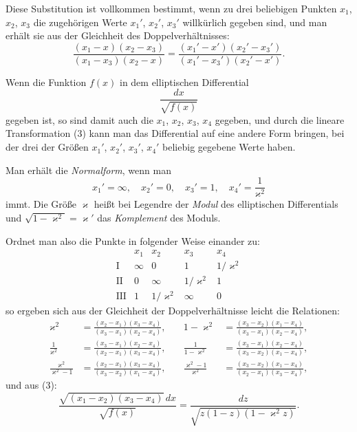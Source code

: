\documentclass[12pt,a4paper]{book}
\theoremstyle{definition}
\begin{document}
Diese Substitution ist vollkommen bestimmt, wenn zu drei
beliebigen Punkten $x_1$, $x_2$, $x_3$ die zugeh\"origen Werte $x_1'$, $x_2'$, $x_3'$
willk\"urlich gegeben sind, und man erh\"alt sie aus der Gleichheit
des Doppelverh\"altnisses:
\begin{equation}
\frac{(x_1 - x)(x_2 - x_3)}{(x_1 - x_3)(x_2 - x)} = \frac{(x_1' - x')(x_2' - x_3')}{(x_1' - x_3')(x_2' - x')}. \tag{4}
\end{equation}

Wenn die Funktion $f(x)$ in dem elliptischen Differential
\[
\frac{dx}{\sqrt{f(x)}}
\]
gegeben ist, so sind damit auch die $x_1$, $x_2$, $x_3$, $x_4$ gegeben, und
durch die lineare Transformation (3) kann man das Differential
auf eine andere Form bringen, bei der drei der Gr\"o\ss en $x_1'$, $x_2'$,
$x_3'$, $x_4'$ beliebig gegebene Werte haben.

Man erh\"alt die \emph{Normalform}, wenn man
\[
x_1' = \infty, \quad x_2' = 0, \quad x_3' = 1, \quad x_4' = \frac{1}{\varkappa^2}
\]
immt. Die Gr\"o\ss e $\varkappa$ hei\ss t bei Legendre der \emph{Modul} des
elliptischen Differentials und $\sqrt{1 - \varkappa^2} = \varkappa'$ das \emph{Komplement}
des Moduls.

Ordnet man also die Punkte in folgender Weise einander zu:
\[
\begin{array}{c|cccc}
& x_1 & x_2 & x_3 & x_4 \\ \hline
\text{I} & \infty & 0 & 1 & 1/\varkappa^2 \\
\text{II} & 0 & \infty & 1/\varkappa^2 & 1 \\
\text{III} & 1 & 1/\varkappa^2 & \infty & 0
\end{array}
\]
so ergeben sich aus der Gleichheit der Doppelverh\"altnisse leicht
die Relationen:
\begin{equation}
\begin{aligned}
\varkappa^2 &= \frac{(x_2 - x_1)(x_3 - x_4)}{(x_3 - x_1)(x_2 - x_4)}, &\quad
1 - \varkappa^2 &= \frac{(x_3 - x_2)(x_1 - x_4)}{(x_3 - x_1)(x_2 - x_4)},\\
\frac{1}{\varkappa^2} &= \frac{(x_3 - x_1)(x_2 - x_4)}{(x_2 - x_1)(x_3 - x_4)}, &\quad
\frac{1}{1 - \varkappa^2} &= \frac{(x_3 - x_1)(x_2 - x_4)}{(x_3 - x_2)(x_1 - x_4)},\\
\frac{\varkappa^2}{\varkappa^2 - 1} &= \frac{(x_2 - x_1)(x_3 - x_4)}{(x_3 - x_2)(x_1 - x_4)}, &\quad
\frac{\varkappa^2 - 1}{\varkappa^2} &= \frac{(x_3 - x_2)(x_1 - x_4)}{(x_2 - x_1)(x_3 - x_4)},
\end{aligned}
\end{equation}
und aus (3):
\begin{equation}
\frac{\sqrt{(x_1 - x_2)(x_3 - x_4)}\,dx}{\sqrt{f(x)}} = \frac{dz}{\sqrt{z(1 - z)(1 - \varkappa^2 z)}}. \tag{9}
\end{equation}
\end{document}
